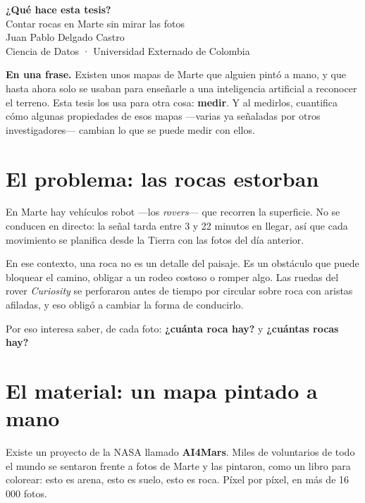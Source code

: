 \documentclass[12pt]{article}
\begin{document}
\thispagestyle{empty}
\begin{center}
{\Huge\bfseries ¿Qué hace esta tesis?}\\[4mm]
{\large\color{gris} Contar rocas en Marte sin mirar las fotos}\\[10mm]
{\normalsize Juan Pablo Delgado Castro}\\[1mm]
{\small\color{gris} Ciencia de Datos · Universidad Externado de Colombia}
\end{center}

\vspace{6mm}

\begin{idea}
\noindent\textbf{En una frase.} Existen unos mapas de Marte que alguien pintó a mano, y que
hasta ahora solo se usaban para enseñarle a una inteligencia artificial a reconocer el
terreno. Esta tesis los usa para otra cosa: \textbf{medir}. Y al medirlos, cuantifica cómo
algunas propiedades de esos mapas —varias ya señaladas por otros investigadores— cambian lo que
se puede medir con ellos.
\end{idea}

\section{El problema: las rocas estorban}

En Marte hay vehículos robot —los \textit{rovers}— que recorren la superficie. No se
conducen en directo: la señal tarda entre 3 y 22 minutos en llegar, así que cada movimiento
se planifica desde la Tierra con las fotos del día anterior.

En ese contexto, una roca no es un detalle del paisaje. Es un obstáculo que puede bloquear
el camino, obligar a un rodeo costoso o romper algo. Las ruedas del rover
\textit{Curiosity} se perforaron antes de tiempo por circular sobre roca con aristas
afiladas, y eso obligó a cambiar la forma de conducirlo.

Por eso interesa saber, de cada foto: \textbf{¿cuánta roca hay?} y \textbf{¿cuántas rocas
hay?}

\section{El material: un mapa pintado a mano}

Existe un proyecto de la NASA llamado \textbf{AI4Mars}. Miles de voluntarios de todo el
mundo se sentaron frente a fotos de Marte y las pintaron, como un libro para colorear: esto
es arena, esto es suelo, esto es roca. Píxel por píxel, en más de 16\,000 fotos.
\end{document}
